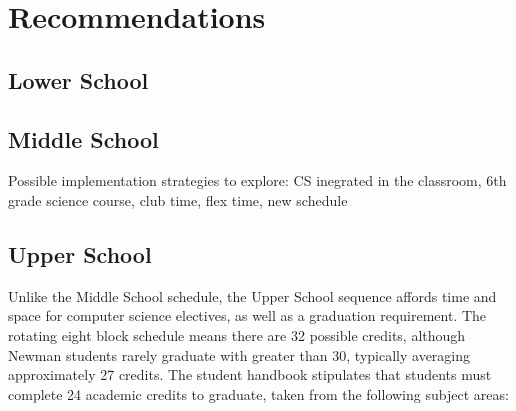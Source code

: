 
\chapter{Recommendations} %

\label{Chapter3} %



\section{Lower School}
\section{Middle School}
Possible implementation strategies to explore: CS inegrated in the classroom, 6th grade science course, club time, flex time, new schedule

\section{Upper School}
Unlike the Middle School schedule, the Upper School sequence affords time and space for computer science electives, as well as a graduation requirement. The rotating eight block schedule means there are 32 possible credits, although Newman students rarely graduate with greater than 30, typically averaging approximately 27 credits. The student handbook stipulates that students must complete 24 academic credits to graduate, taken from the following subject areas: \par

